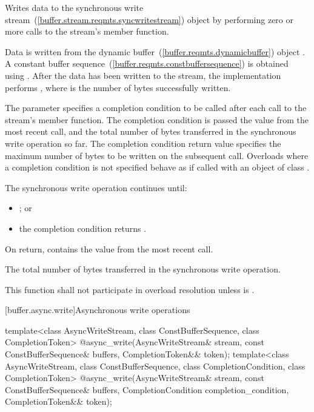 \begin{itemdescr}
\pnum
\effects Writes data to the synchronous write stream~(\ref{buffer.stream.reqmts.syncwritestream}) object  by performing zero or more calls to the stream's  member function.

\pnum
Data is written from the dynamic buffer~(\ref{buffer.reqmts.dynamicbuffer}) object . A constant buffer sequence~(\ref{buffer.reqmts.constbuffersequence}) is obtained using . After the data has been written to the stream, the implementation performs , where  is the number of bytes successfully written.

\pnum
The  parameter specifies a completion condition to be called after each call to the stream's  member function. The completion condition is passed the  value from the most recent  call, and the total number of bytes transferred in the synchronous write operation so far. The completion condition return value specifies the maximum number of bytes to be written on the subsequent  call. Overloads where a completion condition is not specified behave as if called with an object of class .

\pnum
The synchronous write operation continues until:

\begin{itemize}
\item {}; or
\item the completion condition returns .
\end{itemize}

\pnum
On return,  contains the  value from the most recent  call.

\pnum
\returns The total number of bytes transferred in the synchronous write operation.

\pnum
\remarks This function shall not participate in overload resolution unless  is .
\end{itemdescr}



[buffer.async.write]{Asynchronous write operations}

%
\begin{itemdecl}
template<class AsyncWriteStream, class ConstBufferSequence, class CompletionToken>
    @\DEDUCED@ async_write(AsyncWriteStream& stream,
                        const ConstBufferSequence& buffers,
                        CompletionToken&& token);
template<class AsyncWriteStream, class ConstBufferSequence, class CompletionCondition,
         class CompletionToken>
    @\DEDUCED@ async_write(AsyncWriteStream& stream,
                        const ConstBufferSequence& buffers,
                        CompletionCondition completion_condition,
                        CompletionToken&& token);
\end{itemdecl}

